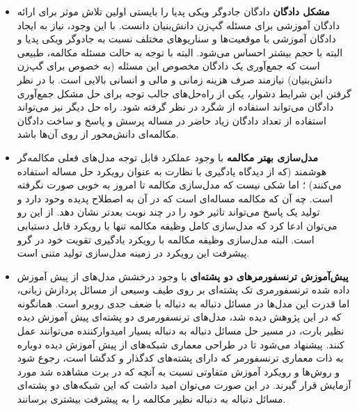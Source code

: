 \begin{itemize}
	\item 
	\textbf{مشکل دادگان}
	دادگان جادوگر ویکی پدیا را بایستی اولین تلاش موثر برای ارائه دادگان آموزشی برای مسئله گپ‌زن دانش‌بنیان دانست. با این وجود،‌ نیاز به ایجاد دادگان آموزشی با موقعیت‌ها و سناریو‌های مختلف نسبت به جادوگر ویکی پدیا و البته با حجم بیشتر احساس می‌شود. البته با توجه به حالت مسئله مکالمه،
	 طبیعی است که جمع‌آوری یک دادگان مخصوص این مسئله (به خصوص برای گپ‌زن دانش‌بنیان) نیازمند صرف هزینه زمانی و مالی و انسانی بالایی است. با در نظر گرفتن این شرایط دشوار،
	 یکی از راه‌حل‌های جالب توجه برای حل مشکل جمع‌آوری دادگان می‌تواند استفاده از شگرد 
	 در نظر گرفته شود. راه حل دیگر نیز می‌تواند استفاده از تعداد دادگان زیاد حاضر در مساله پرسش و پاسخ و ساخت دادگان مکالمه‌ای دانش‌محور از روی آن‌ها باشد.
	\item
	\textbf{مدل‌سازی بهتر مکالمه}
	با وجود عملکرد قابل توجه مدل‌های فعلی مکالمه‌گر هوشمند (که از دیدگاه یادگیری با نظارت به عنوان رویکرد حل مساله استفاده می‌کنند) ؛ اما شکی نیست که مدل‌سازی مکالمه تا امروز به خوبی صورت نگرفته است. چه ‌آن که مکالمه مساله‌ای است که در آن به اصطلاح پدیده 
	وحود دارد و تولید یک پاسخ می‌تواند تاثیر خود را در چند نوبت بعدتر نشان دهد. 
	از این رو می‌توان ادعا کرد که مدل‌سازی کامل وظیفه مکالمه تنها با رویکرد 
	قابل دستیابی است. البته مدل‌سازی وظیفه مکالمه با رویکرد یادگیری تقویت خود در گرو پیشرفت این رویکرد در زمینه مدل‌سازی تولید متنی است.
	\item
	\textbf{پیش‌آموزش ترنسفورمر‌های دو پشته‌ای}
	با وجود درخشش مدل‌های از پیش آموزش داده شده ترنسفورمری تک پشته‌ای بر روی طیف وسیعی از مسائل پردازش زبانی، اما قدرت این مدل‌ها در مسائل دنباله به دنباله با ضعف جدی روبرو است. همانگونه که در این پژوهش دیده شد،‌ مدل‌های ترنسفورمری دو پشته‌ای پیش آموزش دیده نظیر بارت، در مسیر حل مسائل دنباله به دنباله بسیار امیدوارکننده می‌توانند عمل کنند. پیشنهاد می‌شود تا در طراحی معماری شبکه‌های از پیش آموزش دیده دوباره به ذات معماری ترنسفورمر که دارای پشته‌های کدگذار و کدگشا است، رجوع شود و روش‌ها و رویکرد آموزش متفاوتی نسبت به آنچه که در برت مشاهده شد مورد آزمایش قرار گیرند. در این صورت می‌توان امید داشت که این شبکه‌های دو پشته‌ای مسائل دنباله به دنباله نظیر مکالمه را به پیشرفت بیشتری برسانند.
\end{itemize}


